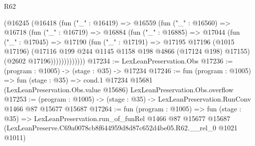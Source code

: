 \begin{lexlean}{R62}
\begin{coremodule}
            (@16245
              (@16418
                (fun ("_" : @16419) =>
                @16559
                  (fun ("_" : @16560) =>
                  @16718
                    (fun ("_" : @16719) =>
                    @16884
                      (fun ("_" : @16885) =>
                      @17044
                        (fun ("_" : @17045) =>
                        @17190
                          (fun ("_" : @17191) =>
                          @17195
                            @17196
                            (@1015 @17196)
                            (@17116 @199 @244 @1145 @1158 @198 @4866 (@17124 @198) @17155)
                            (@2602 @17196)))))))))))))
@17234 := LexLeanPreservation.Obs
@17236 := (program : @1005) -> (stage : @35) -> @17234
@17246 := fun (program : @1005) =>
  fun (stage : @35) =>
  cond.{1} @17234 @15681 (LexLeanPreservation.Obs.value @15686) LexLeanPreservation.Obs.overflow
@17253 := (program : @1005) -> (stage : @35) -> LexLeanPreservation.RunConv @1466 @87 @15677 @15687
@17264 := fun (program : @1005) =>
  fun (stage : @35) =>
  LexLeanPreservation.run_of_funRel
    @1466
    @87
    @15677
    @15687
    (LexLeanPreserve.C69a0078cb8f644959d8d87c652d4be05.R62.__rel_0 @1021 @1011)
\end{coremodule}
\end{lexlean}
